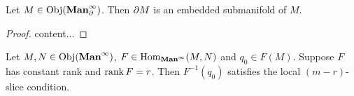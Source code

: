 \documentclass{book}
\begin{document}
	
	\begin{defn}
	
	\end{defn}	
	
	\begin{ex}
	 Let $M \in \operatorname{Obj}(\operatorname*{\text{\textbf{Man}}^{\infty}_{\partial}})$. Then $\partial M$ is an embedded submanifold of $M$. 
	\end{ex}	

	\begin{proof}
		content...
	\end{proof}

	\begin{ex}
		Let $M, N \in \operatorname{Obj}(\operatorname*{\text{\textbf{Man}}^{\infty}})$, $F \in \operatorname{Hom}_{\operatorname*{\text{\textbf{Man}}^{\infty}}}(M,N)$ and $q_0 \in F(M)$. Suppose $F$ has constant rank and $\operatorname{\text{rank}} F = r$. Then $F^{-1}(q_0)$ satisfies the local $(m-r)$-slice condition. 
	\end{ex}
\end{document}

